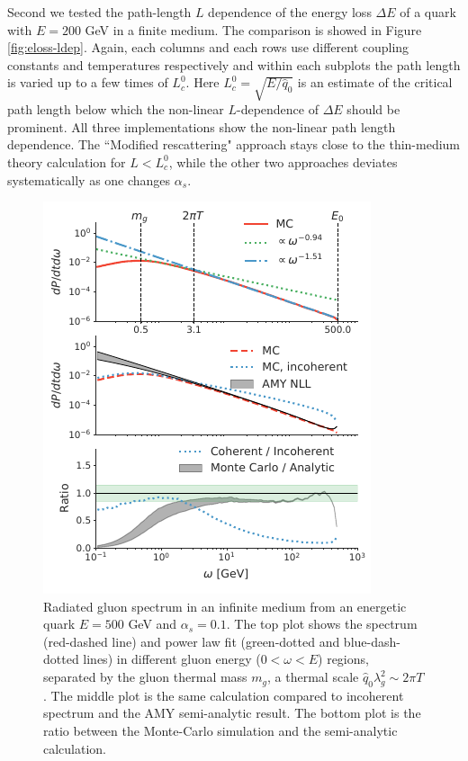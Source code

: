 \documentclass[aps, prc, reprint, amsmath, groupedaddress, nofootinbib]{revtex4-1}
\begin{document}
Second we tested the path-length $L$ dependence of the energy loss $\Delta E$ of a quark with $E = 200$ GeV in a finite medium.
The comparison is showed in Figure \ref{fig:eloss-ldep}.
Again, each columns and each rows use different coupling constants and temperatures respectively and within each subplots the path length is varied up to a few times of $L_c^0$.
Here $L_c^0 = \sqrt{E/\hat{q}_0}$ is an estimate of the critical path length below which the non-linear $L$-dependence of $\Delta E$ should be prominent.
All three implementations show the non-linear path length dependence.
The ``Modified rescattering" approach stays close to the thin-medium theory calculation for $L<L_c^0$, while the other two approaches deviates systematically as one changes $\alpha_s$.

\begin{figure}
\includegraphics[width=\columnwidth]{spectrum.pdf}
\caption{Radiated gluon spectrum in an infinite medium from an energetic quark $E=500$ GeV and $\alpha_s = 0.1$. The top plot shows the spectrum (red-dashed line) and power law fit (green-dotted and blue-dash-dotted lines) in different gluon energy ($0<\omega < E$) regions, separated by the gluon thermal mass $m_g$, a thermal scale $\hat{q}_0\lambda_g^2 \sim 2\pi T$. The middle plot is the same calculation compared to incoherent spectrum and the AMY semi-analytic result. The bottom plot is the ratio between the Monte-Carlo simulation and the semi-analytic calculation.}
\label{fig:spectrum}
\end{figure}
\end{document}
